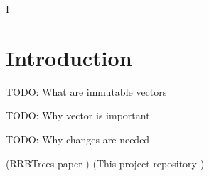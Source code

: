 I%
\lhead{} 

\chapter{Introduction} %
\label{Introduction} %



\color{red} TODO: What are immutable vectors \color{black}

\color{red} TODO: Why vector is important \color{black}

\color{red} TODO: Why changes are needed \color{black}






(RRBTrees paper \cite{RRBTrees})
(This project repository \cite{projecRepo})
